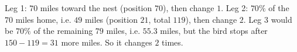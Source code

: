 Leg 1: $70$ miles toward the nest (position $70$), then change $1$. Leg 2: $70\%$ of the $70$ miles home, i.e. $49$ miles (position $21$, total $119$), then change $2$. Leg 3 would be $70\%$ of the remaining $79$ miles, i.e. $55.3$ miles, but the bird stops after $150-119=31$ more miles. So it changes $\boxed{2}$ times.
